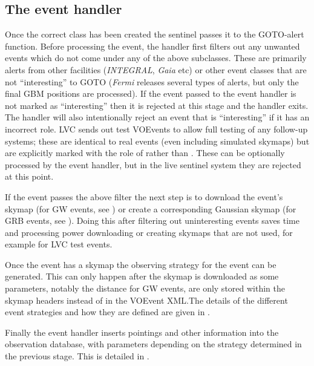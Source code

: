 \subsection{The event handler}
\label{sec:event_handler}
\begin{colsection}

Once the correct  class has been created the sentinel passes it to the GOTO-alert  function. Before processing the event, the handler first filters out any unwanted events which do not come under any of the above subclasses. These are primarily alerts from other facilities (\textit{INTEGRAL}, \textit{Gaia} etc) or other event classes that are not ``interesting'' to GOTO (\textit{Fermi} releases several types of alerts, but only the final GBM positions are processed). If the event passed to the event handler is not marked as ``interesting'' then it is rejected at this stage and the handler exits. The handler will also intentionally reject an event that is ``interesting'' if it has an incorrect role. LVC sends out test VOEvents to allow full testing of any follow-up systems; these are identical to real events (even including simulated skymaps) but are explicitly marked with the role of  rather than . These can be optionally processed by the event handler, but in the live sentinel system they are rejected at this point.

If the event passes the above filter the next step is to download the event's skymap (for GW events, see ) or create a corresponding Gaussian skymap (for GRB events, see ). Doing this after filtering out uninteresting events saves time and processing power downloading or creating skymaps that are not used, for example for LVC test events.

Once the event has a skymap the observing strategy for the event can be generated. This can only happen after the skymap is downloaded as some parameters, notably the distance for GW events, are only stored within the skymap headers instead of in the VOEvent XML.\@ The details of the different event strategies and how they are defined are given in .

Finally the event handler inserts pointings and other information into the observation database, with parameters depending on the strategy determined in the previous stage. This is detailed in .

\newpage

\end{colsection}

